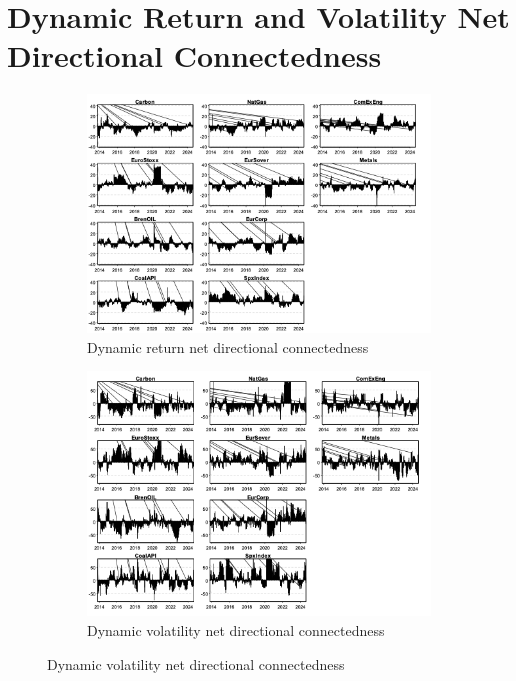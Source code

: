 \documentclass[preprint, 3p,
authoryear]{elsarticle} %
\begin{document}
\section{Dynamic Return and Volatility Net Directional Connectedness}
\label{appendix:b}
\begin{figure}[H]
  \caption{Dynamic Net Directional Connectedness (Jan 2013 – Aug 2024)}
  \label{fig:dynNDCfull}
      \begin{subfigure}[H]{\textwidth}
        \centering
        \caption{Dynamic return net directional connectedness}
        \label{fig:dynretNDCfull}
        \includegraphics[width =\textwidth]{6a-AppBa-DynRetNDCfull}
      \end{subfigure}
    \bigskip
      \begin{subfigure}[H]{\textwidth}
        \centering
        \caption{Dynamic volatility net directional connectedness}
        \label{fig:dynvolNDCfull}
        \includegraphics[width = \textwidth]{6b-AppBb-DynVolNDCfull}
      \end{subfigure}
\end{figure}
\end{document}
